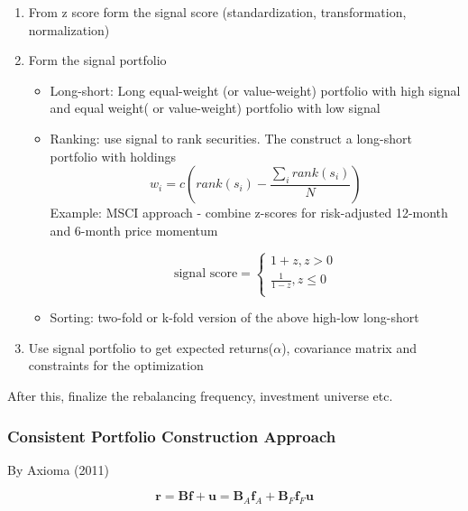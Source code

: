 \documentclass[11pt, openany]{book}              %
\begin{document}
\begin{enumerate}
	\item From z score form the signal score (standardization, transformation, normalization)
	\item Form the signal portfolio
	\begin{itemize}
		\item Long-short: Long equal-weight (or value-weight) portfolio with high signal and equal weight( or value-weight) portfolio with low signal
		\item Ranking: use signal to rank securities. The construct a long-short portfolio with holdings
		$$ w_i = c (rank(s_i) - \frac{\sum_i rank(s_i)}{N})$$
		Example: MSCI approach - combine z-scores for risk-adjusted 12-month and 6-month price momentum
		
		$$\text{signal score}=
		\left\{
			\begin{aligned}
			1+z, z > 0\\
			\frac{1}{1-z}, z \leq 0 \\
			\end{aligned}
		\right.$$
		
		\item Sorting: two-fold or k-fold version of the above high-low long-short
	\end{itemize}
	\item Use signal portfolio to get expected returns($\alpha$), covariance matrix and constraints for the optimization
\end{enumerate}

After this, finalize the rebalancing frequency, investment universe etc.

\subsubsection{Consistent Portfolio Construction Approach}

By Axioma (2011)

$$\mathbf{r} = \mathbf{Bf} + \mathbf{u} = \mathbf{B}_A\mathbf{f}_A + \mathbf{B}_F\mathbf{f}_F\mathbf{u} $$
\end{document}

